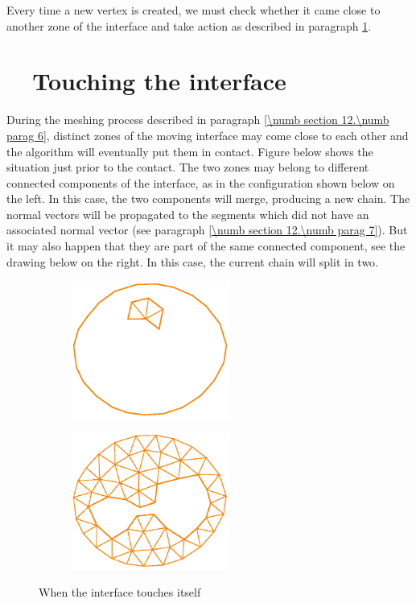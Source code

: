 Every time a new vertex is created, we must check whether it came close to another
zone of the interface and take action as described in paragraph
\ref{\numb section 12.\numb parag 9}.


\section{~~Touching the interface}\label{\numb section 12.\numb parag 9}

During the meshing process described in paragraph \ref{\numb section 12.\numb parag 6},
distinct zones of the moving interface may
come close to each other and the algorithm will eventually put them in contact.
Figure below shows the situation just prior to the contact.
The two zones may belong to different connected components of the interface,
as in the configuration shown below on the left.
In this case, the two components will merge, producing a new chain.
The normal vectors will be propagated to the segments which did not have an associated
normal vector (see paragraph \ref{\numb section 12.\numb parag 7}).
But it may also happen that they are part of the same connected component,
see the drawing below on the right.
In this case, the current chain will split in two.

\begin{figure}[ht] \centering
\begin{subfigure}{65mm}\centering
  \includegraphics[width=52mm]{touching-interf-1}
\end{subfigure}  
\begin{subfigure}{65mm}\centering
  \includegraphics[width=52mm]{touching-interf-2}
\end{subfigure}  
  \caption{When the interface touches itself}
  \label{\numb section 12.\numb fig 7}
\end{figure}

